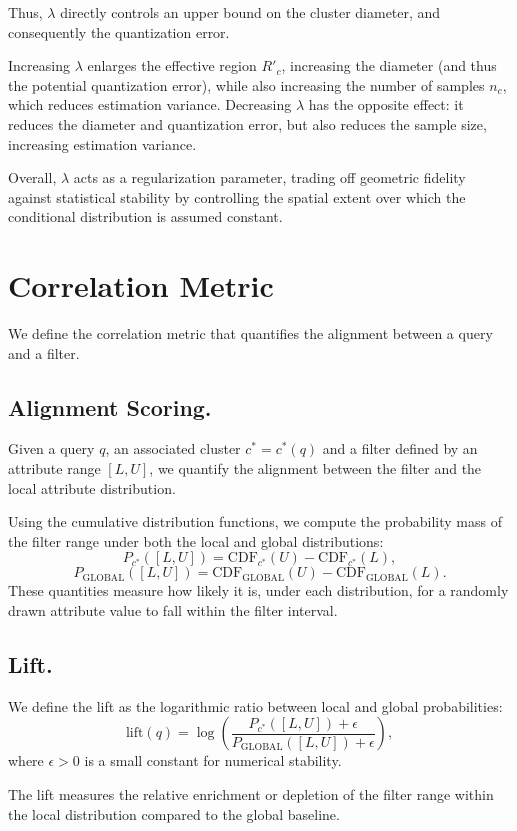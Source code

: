 Thus, \(\lambda\) directly controls an upper bound on the cluster diameter, and
consequently the quantization error.

Increasing \(\lambda\) enlarges the effective region \(R'_c\), increasing the
diameter (and thus the potential quantization error), while also increasing the
number of samples \(n_c\), which reduces estimation variance. Decreasing
\(\lambda\) has the opposite effect: it reduces the diameter and quantization
error, but also reduces the sample size, increasing estimation variance.

Overall, \(\lambda\) acts as a regularization parameter, trading off geometric
fidelity against statistical stability by controlling the spatial extent over
which the conditional distribution is assumed constant.

\section{Correlation Metric}
We define the correlation metric that quantifies the alignment between a query and a filter. 

\subsection{Alignment Scoring.}
Given a query $q$, an associated cluster $c^* = c^*(q)$ and a filter defined by an attribute range $[L,U]$, we quantify the alignment between the filter and the local attribute distribution.

Using the cumulative distribution functions, we compute the probability mass of the filter range under both the local and global distributions:
\[
P_{c^*}([L,U]) = \mathrm{CDF}_{c^*}(U) - \mathrm{CDF}_{c^*}(L),
\]
\[
P_{\mathrm{GLOBAL}}([L,U]) = \mathrm{CDF}_{\mathrm{GLOBAL}}(U) - \mathrm{CDF}_{\mathrm{GLOBAL}}(L).
\]
These quantities measure how likely it is, under each distribution, for a randomly drawn attribute value to fall within the filter interval.

\subsection{Lift.}
We define the lift as the logarithmic ratio between local and global probabilities:
\[
\mathrm{lift}(q) = \log \left( \frac{P_{c^*}([L,U]) + \epsilon}{P_{\mathrm{GLOBAL}}([L,U]) + \epsilon} \right),
\]
where $\epsilon > 0$ is a small constant for numerical stability.

The lift measures the relative enrichment or depletion of the filter range within the local distribution compared to the global baseline.

